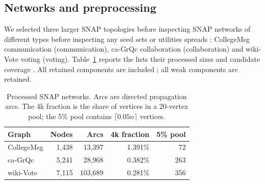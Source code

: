 \documentclass[smallextended]{svjour3}
\providecommand{\DIFaddtex}[1]{{\protect\color{blue} \sf #1}} %
\providecommand{\DIFdeltex}[1]{{\protect\color{red} \scriptsize #1}} %
\providecommand{\DIFaddbegin}{} %
\providecommand{\DIFaddend}{} %
\providecommand{\DIFdelbegin}{} %
\providecommand{\DIFdelend}{} %
\providecommand{\DIFadd}[1]{\texorpdfstring{\DIFaddtex{#1}}{#1}} %
\providecommand{\DIFdel}[1]{\texorpdfstring{\DIFdeltex{#1}}{}} %
\providecommand{\DIFscaledelfig}{0.5}
\newlength{\DIFdelgraphicswidth} %
\newlength{\DIFdelgraphicsheight} %
\providecommand{\DIFaddincludegraphics}[2][]{{\color{blue}\fbox{\DIFOincludegraphics[#1]{#2}}}} %
\providecommand{\DIFdelincludegraphics}[2][]{%
\sbox{\DIFdelgraphicsbox}{\DIFOincludegraphics[#1]{#2}}%
\settoboxwidth{\DIFdelgraphicswidth}{\DIFdelgraphicsbox} %
\settoboxtotalheight{\DIFdelgraphicsheight}{\DIFdelgraphicsbox} %
\scalebox{\DIFscaledelfig}{%
\parbox[b]{\DIFdelgraphicswidth}{\usebox{\DIFdelgraphicsbox}\\[-\baselineskip] \rule{\DIFdelgraphicswidth}{0em}}\llap{\resizebox{\DIFdelgraphicswidth}{\DIFdelgraphicsheight}{%
\setlength{\unitlength}{\DIFdelgraphicswidth}%
\begin{picture}(1,1)%
\thicklines\linethickness{2pt} %
{\color[rgb]{1,0,0}\put(0,0){\framebox(1,1){}}}%
{\color[rgb]{1,0,0}\put(0,0){\line( 1,1){1}}}%
{\color[rgb]{1,0,0}\put(0,1){\line(1,-1){1}}}%
\end{picture}%
}\hspace*{3pt}}} %
} %
\DeclareRobustCommand{\DIFaddbegin}{\DIFOaddbegin \let\includegraphics\DIFaddincludegraphics} %
\DeclareRobustCommand{\DIFaddend}{\DIFOaddend \let\includegraphics\DIFOincludegraphics} %
\DeclareRobustCommand{\DIFdelbegin}{\DIFOdelbegin \let\includegraphics\DIFdelincludegraphics} %
\DeclareRobustCommand{\DIFdelend}{\DIFOaddend \let\includegraphics\DIFOincludegraphics} %
\begin{document}
\subsection{Networks and preprocessing}
We selected three \DIFdelbegin \DIFdel{larger SNAP topologies before inspecting }\DIFdelend \DIFaddbegin \DIFadd{SNAP networks of different types before inspecting any }\DIFaddend seed sets or \DIFdelbegin \DIFdel{utilities }\DIFdelend \DIFaddbegin \DIFadd{spreads }\DIFaddend \cite{snap}: CollegeMsg \DIFdelbegin \DIFdel{communication}\DIFdelend \DIFaddbegin \DIFadd{(communication)}\DIFaddend , ca-GrQc \DIFdelbegin \DIFdel{collaboration }\DIFdelend \DIFaddbegin \DIFadd{(collaboration) }\DIFaddend and wiki-Vote \DIFdelbegin \DIFdel{voting}\DIFdelend \DIFaddbegin \DIFadd{(voting)}\DIFaddend . Table~\ref{tab:data} \DIFdelbegin \DIFdel{reports the }\DIFdelend \DIFaddbegin \DIFadd{lists their }\DIFaddend processed sizes and candidate coverage\DIFdelbegin \DIFdel{. All retained components are included}\DIFdelend \DIFaddbegin \DIFadd{; all weak components are retained}\DIFaddend .
\begin{table}[htbp]
\caption{Processed SNAP networks. Arcs are directed propagation arcs. The 4k fraction is the share of vertices in a 20-vertex pool; the 5\% pool contains $\lceil 0.05n\rceil$ vertices.}\label{tab:data}
\begin{tabular}{lrrrr}
\toprule
Graph & Nodes & Arcs & 4k fraction & 5\% pool \\
\midrule
CollegeMsg & 1,438 & 13,397 & 1.391\% & 72 \\
ca-GrQc & 5,241 & 28,968 & 0.382\% & 263 \\
wiki-Vote & 7,115 & 103,689 & 0.281\% & 356 \\
\bottomrule
\end{tabular}
\end{table}
\end{document}
